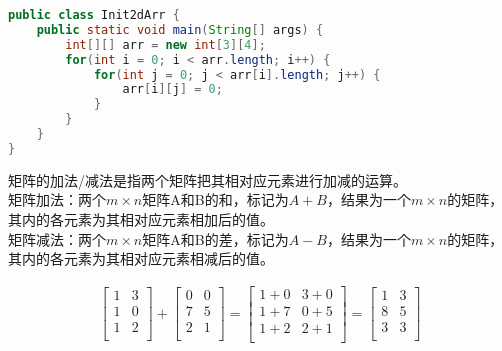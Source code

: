 \vspace{0.5cm}


\begin{lstlisting}[language=Java]
public class Init2dArr {
    public static void main(String[] args) {
        int[][] arr = new int[3][4];
        for(int i = 0; i < arr.length; i++) {
            for(int j = 0; j < arr[i].length; j++) {
                arr[i][j] = 0;
            }
        }
    }
}
\end{lstlisting}

\vspace{0.5cm}


\vspace{0.5cm}

矩阵的加法/减法是指两个矩阵把其相对应元素进行加减的运算。\\

矩阵加法：两个$ m \times n $矩阵A和B的和，标记为$ A + B $，结果为一个$ m \times n $的矩阵，其内的各元素为其相对应元素相加后的值。\\

矩阵减法：两个$ m \times n $矩阵A和B的差，标记为$ A - B $，结果为一个$ m \times n $的矩阵，其内的各元素为其相对应元素相减后的值。

\begin{align}\nonumber
	\left[\begin{matrix}
			1 & 3 \\
			1 & 0 \\
			1 & 2 \\
		\end{matrix} \right]
	+
	\left[\begin{matrix}
			0 & 0 \\
			7 & 5 \\
			2 & 1 \\
		\end{matrix} \right]
	=
	\left[\begin{matrix}
			1+0 & 3+0 \\
			1+7 & 0+5 \\
			1+2 & 2+1 \\
		\end{matrix} \right]
	=
	\left[\begin{matrix}
			1 & 3 \\
			8 & 5 \\
			3 & 3 \\
		\end{matrix} \right]
\end{align}

